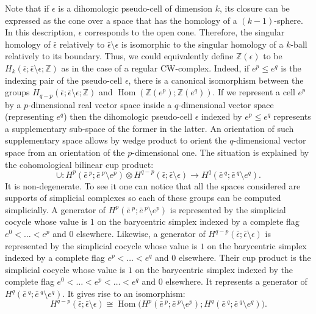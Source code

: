 \documentclass[AHL,Unicode,longabstracts,published]{cedram}
\newcommand{\Z}{\mathbb{Z}}
\DeclareMathOperator{\Hom}{Hom}
\begin{document}
Note that if $\epsilon$ is a dihomologic pseudo-cell of dimension $k$, its closure can be expressed as the cone over a space that has the homology of a $(k-1)$-sphere. In this description, $\epsilon$ corresponds to the open cone. Therefore, the singular homology of $\bar{\epsilon}$ relatively to $\bar{\epsilon}\setminus\epsilon$ is isomorphic to the singular homology of a $k$-ball relatively to its boundary. Thus, we could equivalently define $\Z(\epsilon)$ to be $H_k(\bar{\epsilon};\bar{\epsilon}\setminus\epsilon;\Z)$ as in the case of a regular CW-complex. Indeed, if $e^p\leq e^q$ is the indexing pair of the pseudo-cell $\epsilon$, there is a canonical isomorphism between the groups $H_{q-p}(\bar{\epsilon};\bar{\epsilon}\setminus\epsilon;\Z)$ and $\Hom(\Z(e^p);\Z(e^q))$. If we represent a cell $e^p$ by a $p$-dimensional real vector space inside a $q$-dimensional vector space (representing $e^q$) then the dihomologic pseudo-cell $\epsilon$ indexed by $e^p\leq e^q$ represents a supplementary sub-space of the former in the latter. An orientation of such supplementary space allows by wedge product to orient the $q$-dimensional vector space from an orientation of the $p$-dimensional one. The situation is explained by the cohomological bilinear cup product:
\begin{equation*}
\cup : H^p\left(\bar{e}\,^p;\bar{e}\,^p\setminus e^p\right)\otimes H^{q-p}\left(\bar{\epsilon};\bar{\epsilon}\setminus\epsilon\right) \rightarrow H^q\left(\bar{e}\,^q;\bar{e}\,^q\setminus e^q\right).
\end{equation*}
It is non-degenerate. To see it one can notice that all the spaces considered are supports of simplicial complexes so each of these groups can be computed simplicially. A generator of $H^p(\bar{e}\,^p;\bar{e}\,^p\setminus e^p)$ is represented by the simplicial cocycle whose value is $1$ on the barycentric simplex indexed by a complete flag $e^0<\dots<e^p$ and $0$ elsewhere. Likewise, a generator of $H^{q-p}(\bar{\epsilon};\bar{\epsilon}\setminus\epsilon)$ is represented by the simplicial cocycle whose value is $1$ on the barycentric simplex indexed by a complete flag $e^p<\dots<e^q$ and $0$ elsewhere. Their cup product is the simplicial cocycle whose value is $1$ on the barycentric simplex indexed by the complete flag $e^0<\dots<e^p<\dots<e^q$ and $0$ elsewhere. It represents a generator of $H^q(\bar{e}\,^q;\bar{e}\,^q\setminus e^q)$. It gives rise to an isomorphism:
\begin{equation*}
H^{q-p}(\bar{\epsilon};\bar{\epsilon}\setminus\epsilon)\cong \Hom\Big(H^p\left(\bar{e}\,^p;\bar{e}\,^p\setminus e^p\right);H^q\left(\bar{e}\,^q;\bar{e}\,^q\setminus e^q\right)\Big).
\end{equation*}
\end{document}
